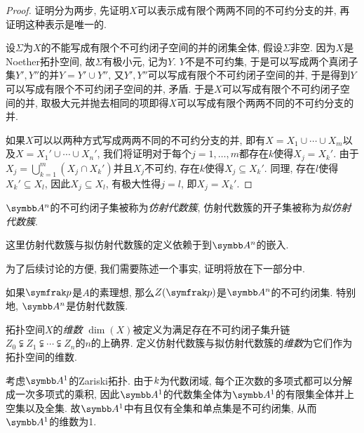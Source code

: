\begin{proof}
  证明分为两步, 先证明$X$可以表示成有限个两两不同的不可约分支的并, 再证明这种表示是唯一的.

  设$\Sigma$为$X$的不能写成有限个不可约闭子空间的并的闭集全体, 假设$\Sigma$非空. 因为$X$是Noether拓扑空间, 故$\Sigma$有极小元, 记为$Y$. $Y$不是不可约集, 于是可以写成两个真闭子集$Y', Y''$的并$Y=Y'\cup Y''$, 又$Y', Y''$可以写成有限个不可约闭子空间的并, 于是得到$Y$可以写成有限个不可约闭子空间的并, 矛盾. 于是$X$可以写成有限个不可约闭子空间的并, 取极大元并抛去相同的项即得$X$可以写成有限个两两不同的不可约分支的并.

  如果$X$可以以两种方式写成两两不同的不可约分支的并, 即有$X=X_1\cup\dotsb\cup X_m$以及$X=X_1'\cup\dotsb\cup X_n'$, 我们将证明对于每个$j=1, \dotsc, m$都存在$k$使得$X_j=X_k'$. 由于$X_j=\bigcup_{k=1}^m(X_j\cap X_k')$并且$X_j$不可约, 存在$k$使得$X_j\subseteq X_k'$. 同理, 存在$l$使得$X_k'\subseteq X_l$, 因此$X_j\subseteq X_l$, 有极大性得$j=l$, 即$X_j=X_k'$.
\end{proof}

\begin{definition}
  $\AF^n$的不可约闭子集被称为\emph{仿射代数簇}, 仿射代数簇的开子集被称为\emph{拟仿射代数簇}.
\end{definition}

\begin{remark}
  这里仿射代数簇与拟仿射代数簇的定义依赖于到$\AF^n$的嵌入.
\end{remark}

为了后续讨论的方便, 我们需要陈述一个事实, 证明将放在下一部分中.

\begin{propositionnoproof}\label{prop:affineprimeirreducible}
  如果$\ideal{p}$是$A$的素理想, 那么$Z(\ideal{p})$是$\AF^n$的不可约闭集. 特别地, $\AF^n$是仿射代数簇.
\end{propositionnoproof}

\begin{definition}
  拓扑空间$X$的\emph{维数} $\dim (X)$被定义为满足存在不可约闭子集升链$Z_0\subsetneqq Z_1\subsetneqq \dotsb \subsetneqq Z_n$的$n$的上确界. 定义仿射代数簇与拟仿射代数簇的\emph{维数}为它们作为拓扑空间的维数.
\end{definition}

\begin{example}
  考虑$\AF^1$的Zariski拓扑. 由于$k$为代数闭域, 每个正次数的多项式都可以分解成一次多项式的乘积, 因此$\AF^1$的代数集全体为$\AF^1$的有限集全体并上空集以及全集. 故$\AF^1$中有且仅有全集和单点集是不可约闭集, 从而$\AF^1$的维数为1.
\end{example}


